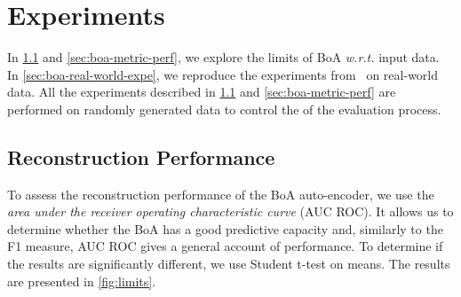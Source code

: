 
\section{Experiments}\label{sec:boa-expe}
In \cref{sec:boa-reconstruction} and \cref{sec:boa-metric-perf}, we explore the limits of BoA \textit{w.r.t.} input data.
In \cref{sec:boa-real-world-expe}, we reproduce the experiments from~\cite{fca2vec:2019:durrschnabel} on real-world data.
All the experiments described in \cref{sec:boa-reconstruction} and \cref{sec:boa-metric-perf} are performed on randomly generated data to control the of the evaluation process.

    
\subsection{Reconstruction Performance}\label{sec:boa-reconstruction}
To assess the reconstruction performance of the BoA auto-encoder, we use the \textit{area under the receiver operating characteristic curve} (AUC ROC).
It allows us to determine whether the BoA has a good predictive capacity and, similarly to the F1 measure, AUC ROC gives a general account of performance. %
To determine if the results are significantly different, we use Student t-test on means.
The results are presented in \cref{fig:limits}.

